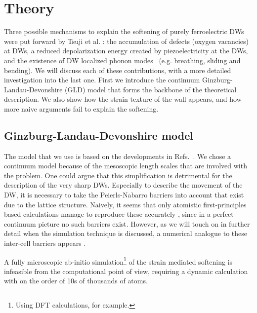 \section{Theory}
Three possible mechanisms to explain the softening of purely ferroelectric DWs were put forward by Tsuji et al. \cite{Tsuji2005}: the accumulation of defects (oxygen vacancies) at DWs, a reduced depolarization energy created by piezoelectricity at the DWs, and the existence of DW localized phonon modes~\cite{Chen2020} (e.g. breathing, sliding and bending). We will discuss each of these contributions, with a more detailed investigation into the last one.
First we introduce the continuum Ginzburg-Landau-Devonshire (GLD) model that forms the backbone of the theoretical description.
We also show how the strain texture of the wall appears, and how more naive arguments fail to explain the softening.

\subsection{Ginzburg-Landau-Devonshire model}
The model that we use is based on the developments in Refs.~\cite{Zhirnov1959,L.N.Bulaevskii1963,Marton2010}.
We chose a continuum model because of the mesoscopic length scales that are involved with the problem.
One could argue that this simplification is detrimental for the description of the very sharp DWs.
Especially to describe the movement of the DW, it is necessary to take the Peierls-Nabarro barriers into account that exist due to the lattice structure.
Naively, it seems that only atomistic first-principles based calculations manage to reproduce these accurately \cite{Meyer2002}, since in a perfect continuum picture no such barriers exist.
However, as we will touch on in further detail when the simulation technique is discussed, a numerical analogue to these inter-cell barriers appears \cite{Marton2018}.

A fully microscopic ab-initio simulation\footnote{Using DFT calculations, for example.} of the strain mediated softening is infeasible from the computational point of view, requiring a dynamic calculation with on the order of 10s of thousands of atoms.

